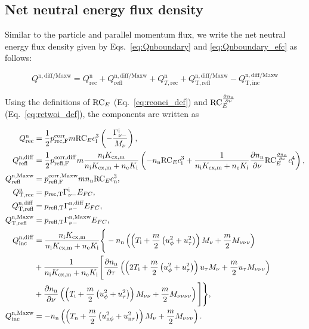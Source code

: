 \subsection{Net neutral energy flux density}

Similar to the particle and parallel momentum flux, we write the net neutral energy flux density given by Eqs.~\eqref{eq:Qnboundary} and \eqref{eq:Qnboundary_efc} as follows:

\begin{equation}
    Q^{\mathrm{n,diff/Maxw}} = Q^{\mathrm{n}}_{\mathrm{rec}} + Q^{\mathrm{n,diff/Maxw}}_{\mathrm{refl}} + Q^{\mathrm{n}}_{T,\mathrm{rec}} + Q^{\mathrm{n,diff/Maxw}}_{\mathrm{T,refl}} - Q^{\mathrm{n,diff/Maxw}}_{\mathrm{T,inc}}
\end{equation}

\noindent Using the definitions of $\reonei$ (Eq.~\eqref{eq:reonei_def}) and $\retwoi$ (Eq.~\eqref{eq:retwoi_def}), the components are written as

\begin{align}
    Q^{\mathrm{n}}_{\mathrm{rec}} & = \frac{1}{2} \pcorfi m \reonei \ci^3 \left( - \frac{\fdni}{\ionel} \right), \\
    Q^{\mathrm{n,diff}}_{\mathrm{refl}} & = \frac{1}{2} \pcorfnd m \frac{\vcx}{\vtot} \left( - \nn \reonei \ci^3 + \frac{1}{\vtot} \dnndz \retwoi \ci^4 \right), \\
    Q^{\mathrm{n,Maxw}}_{\mathrm{refl}} & = \pcorfnm m \nn \reonei \cn^3, \\
    Q^{\mathrm{n}}_{\mathrm{T,rec}} & = \pti \fdni \efc, \\
    Q^{\mathrm{n,diff}}_{\mathrm{T,refl}} & = \ptn \fnnid \efc, \\
    Q^{\mathrm{n,Maxw}}_{\mathrm{T,refl}} & = \ptn \fnnim \efc,\\
    Q^{\mathrm{n,diff}}_{\mathrm{inc}} & = \frac{\vcx}{\vtot} \Bigg\{ -\nn \left( \left(\Ti + \frac{m}{2} \left( \ux^2 + \uy^2 \right) \right) \ionel + \frac{m}{2} \ithreel \right) \nonumber \\ & + \frac{1}{\vtot} \Bigg[ \dnndy \left( \left( 2 \Ti + \frac{m}{2} \left( \ux^2 + \uy^2 \right) \right) \uy \ionel + \frac{m}{2} \uy \ithreel \right) \nonumber \\
    & + \dnndz \left( \left( \Ti + \frac{m}{2} \left( \ux^2 + \uy^2 \right) \right) \itwol + \frac{m}{2} \ifourl \right) \Bigg] \Bigg\}, \\
    Q^{\mathrm{n,Maxw}}_{\mathrm{inc}} & = -\nn \left( \left( \Tn + \frac{m}{2} \left( \uxn^2 + \uyn^2 \right) \right) \ionel + \frac{m}{2} \ithreel \right).
\end{align}

